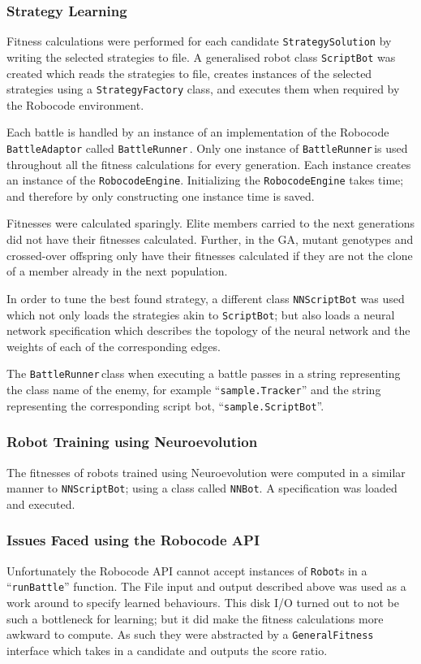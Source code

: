 \subsubsection{Strategy Learning}

Fitness calculations were performed for each candidate \texttt{StrategySolution} by writing the selected strategies to file. A generalised robot class \texttt{ScriptBot} was created which reads the strategies to file, creates instances of the selected strategies using a \texttt{StrategyFactory} class, and executes them when required by the Robocode environment.

\newcommand{\BattleRunner}{\texttt{BattleRunner}\,}

Each battle is handled by an instance of an implementation of the Robocode \\ \texttt{BattleAdaptor} called \BattleRunner. Only one instance of \BattleRunner  is used throughout all the fitness calculations for every generation. Each instance creates an instance of the \texttt{RobocodeEngine}. Initializing the \texttt{RobocodeEngine} takes time; and therefore by only constructing one instance time is saved.

Fitnesses were calculated sparingly. Elite members carried to the next generations did not have their fitnesses calculated. Further, in the GA, mutant genotypes and crossed-over offspring only have their fitnesses calculated if they are not the clone of a member already in the next population.

In order to tune the best found strategy, a different class \texttt{NNScriptBot} was used which not only loads the strategies akin to \texttt{ScriptBot}; but also loads a neural network specification which describes the topology of the neural network and the weights of each of the corresponding edges.

The \BattleRunner class when executing a battle passes in a string representing the class name of the enemy, for example ``\texttt{sample.Tracker}'' and the string representing the corresponding script bot, ``\texttt{sample.ScriptBot}''.

\subsubsection{Robot Training using Neuroevolution}

The fitnesses of robots trained using Neuroevolution were computed in a similar manner to \texttt{NNScriptBot}; using a class called \texttt{NNBot}. A specification was loaded and executed. 

\subsubsection{Issues Faced using the Robocode API}
Unfortunately the Robocode API cannot accept instances of \texttt{Robot}s in a ``\texttt{runBattle}'' function. The File input and output described above was used as a work around to specify learned behaviours. This disk I/O turned out to not be such a bottleneck for learning; but it did make the fitness calculations more awkward to compute.  As such they were abstracted by a \texttt{GeneralFitness} interface which takes in a candidate and outputs the score ratio.
